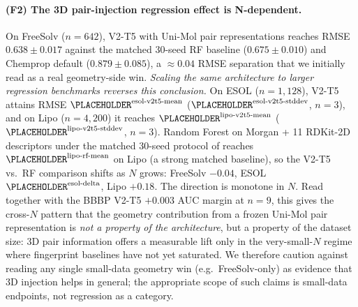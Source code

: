 %


\paragraph{(F2) The 3D pair-injection regression effect is N-dependent.}
On FreeSolv ($n{=}642$), V2-T5 with Uni-Mol pair representations reaches
RMSE $0.638 \pm 0.017$ against the matched 30-seed RF baseline
($0.675 \pm 0.010$) and Chemprop default ($0.879 \pm 0.085$), a
$\approx 0.04$ RMSE separation that we initially read as a real
geometry-side win. \emph{Scaling the same architecture to larger
regression benchmarks reverses this conclusion.} On ESOL
($n{=}1{,}128$), V2-T5 attains RMSE $\PLACEHOLDER^{\text{esol-v2t5-mean}}$
($\PLACEHOLDER^{\text{esol-v2t5-stddev}}$, $n{=}3$), and on Lipo
($n{=}4{,}200$) it reaches $\PLACEHOLDER^{\text{lipo-v2t5-mean}}$
($\PLACEHOLDER^{\text{lipo-v2t5-stddev}}$, $n{=}3$). Random Forest on
Morgan + 11 RDKit-2D descriptors under the matched 30-seed protocol of
\citet{deng2023systematic} reaches
$\PLACEHOLDER^{\text{lipo-rf-mean}}$ on Lipo (a strong matched
baseline), so the V2-T5 vs.\ RF comparison shifts as $N$ grows: FreeSolv
$-0.04$, ESOL $\PLACEHOLDER^{\text{esol-delta}}$, Lipo $+0.18$. The
direction is monotone in $N$. Read together with the BBBP V2-T5
$+0.003$ AUC margin at $n{=}9$, this gives the cross-$N$ pattern that
the geometry contribution from a frozen Uni-Mol pair representation is
\emph{not a property of the architecture}, but a property of the
dataset size: 3D pair information offers a measurable lift only in
the very-small-$N$ regime where fingerprint baselines have not yet
saturated. We therefore caution against reading any single small-data
geometry win (e.g.\ FreeSolv-only) as evidence that 3D injection helps
in general; the appropriate scope of such claims is small-data
endpoints, not regression as a category.

